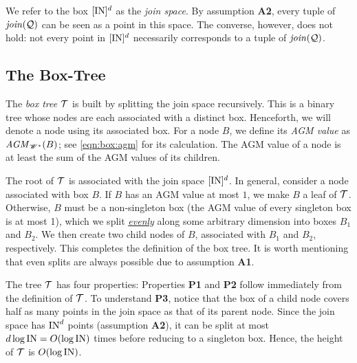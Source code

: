 \vgap

We refer to the box $[\mathrm{IN}]^d$ as the {\em join space}. By assumption {\bf A2}, every tuple of $\mathit{join}(\mathcal{Q})$ can be seen as a point in this space. The converse, however, does not hold: not every point in $[\mathrm{IN}]^d$ necessarily corresponds to a tuple of $\mathit{join}(\mathcal{Q})$.


\subsection{The Box-Tree} \label{sec:boxtree:boxtree}

The {\em box tree} $\mathcal{T}$ is built by splitting the join space recursively. This is a binary tree whose nodes are each associated with a distinct box. Henceforth, we will denote a node using its associated box. For a node $B$, we define its {\em AGM value} as $\mathit{AGM}_{\mathscr{W}^*}(B)$; see \eqref{eqn:box:agm} for its calculation. The AGM value of a node is at least the sum of the AGM values of its children.

\vgap

The root of $\mathcal{T}$ is associated with the join space $[\mathrm{IN}]^d$. In general, consider a node associated with box $B$. If $B$ has an AGM value at most $1$, we make $B$ a leaf of $\mathcal{T}$. Otherwise, $B$ must be a non-singleton box (the AGM value of every singleton box is at most 1), which we split \uline{\em evenly} along some arbitrary dimension into boxes $B_1$ and $B_2$. We then create two child nodes of $B$, associated with $B_1$ and $B_2$, respectively. This completes the definition of the box tree. It is worth mentioning that even splits are always possible due to assumption {\bf A1}.

\vgap

The tree $\mathcal{T}$ has four properties:
Properties {\bf P1} and {\bf P2} follow immediately from the definition of $\mathcal{T}$. To understand {\bf P3}, notice that the box of a child node covers half as many points in the join space as that of its parent node. Since the join space has $\mathrm{IN}^d$ points (assumption {\bf A2}), it can be split at most $d \log \mathrm{IN} = O(\log \mathrm{IN})$ times before reducing to a singleton box. Hence, the height of $\mathcal{T}$ is $O(\log \mathrm{IN})$.

